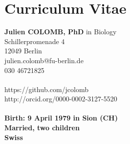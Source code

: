 %

\section* {Curriculum Vitae}






\small

\begin{minipage}[t]{\textwidth}
    \begin{minipage}[b]{0.5\textwidth}
        \textbf{Julien COLOMB, PhD} in Biology\\
        Schillerpromenade 4\\
        12049 Berlin\\
        julien.colomb@fu-berlin.de\\
        030 46721825\\
         \\
        https://github.com/jcolomb\\
         http://orcid.org/0000-0002-3127-5520\\
         \\
   
        \textbf{Birth: 9 April 1979 in Sion (CH)}\\
        \textbf{Married, two children}\\
        \textbf{Swiss}
         

\end{minipage}
\end{minipage}
